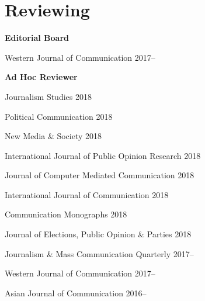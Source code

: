 \section{Reviewing}

  \textbf{Editorial Board}
    \begin{innerlist}
      \item Western Journal of Communication \hfill 2017--
    \end{innerlist}\vspace{1em}

  \textbf{Ad Hoc Reviewer}
    \begin{innerlist}
      \item Journalism Studies \hfill 2018
      \item Political Communication \hfill 2018
      \item New Media \& Society \hfill 2018
      \item International Journal of Public Opinion Research \hfill 2018
      \item Journal of Computer Mediated Communication \hfill 2018
      \item International Journal of Communication \hfill 2018
      \item Communication Monographs \hfill 2018
      \item Journal of Elections, Public Opinion \& Parties \hfill 2018
      \item Journalism \& Mass Communication Quarterly \hfill 2017--
      \item Western Journal of Communication \hfill 2017--
      \item Asian Journal of Communication \hfill 2016--
    \end{innerlist}\vspace{-.075in}
